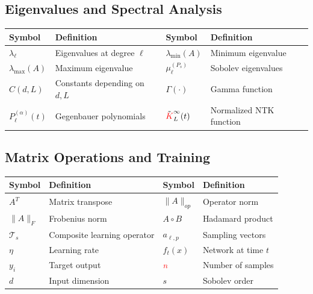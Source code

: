 \documentclass[a4paper]{article}
\theoremstyle{plain}
\theoremstyle{definition}
\theoremstyle{remark}
\begin{document}
\begin{tcolorbox}[colback=blue!5,colframe=blue!50!black,title={\large \textbf{Mathematical Notation Reference}},enhanced,drop shadow]
\subsection*{Eigenvalues and Spectral Analysis}
\begin{longtable}{p{}p{}p{}p{}}
\toprule
\textbf{Symbol} & \textbf{Definition} & \textbf{Symbol} & \textbf{Definition} \\
\midrule
$\lambda_\ell$ & Eigenvalues at degree $\ell$ & $\lambda_{\min}(A)$ & Minimum eigenvalue \\
$\lambda_{\max}(A)$ & Maximum eigenvalue & $\mu_\ell^{(P_s)}$ & Sobolev eigenvalues \\
$C(d,L)$ & Constants depending on $d,L$ & $\Gamma(\cdot)$ & Gamma function \\
$P_\ell^{(\alpha)}(t)$ & Gegenbauer polynomials & $\tilde{\textcolor{red}{K}}_L^{\infty}(t)$ & Normalized NTK function \\
\bottomrule
\end{longtable}

\subsection*{Matrix Operations and Training}
\begin{longtable}{p{}p{}p{}p{}}
\toprule
\textbf{Symbol} & \textbf{Definition} & \textbf{Symbol} & \textbf{Definition} \\
\midrule
$A^T$ & Matrix transpose & $\|A\|_{op}$ & Operator norm \\
$\|A\|_F$ & Frobenius norm & $A \circ B$ & Hadamard product \\
$\mathcal{T}_s$ & Composite learning operator & $a_{\ell,p}$ & Sampling vectors \\
$\eta$ & Learning rate & $f_t(x)$ & Network at time $t$ \\
$y_i$ & Target output & $\textcolor{red}{n}$ & Number of samples \\
$d$ & Input dimension & $s$ & Sobolev order \\
\bottomrule
\end{longtable}

\end{tcolorbox}

\newpage
\end{document}

